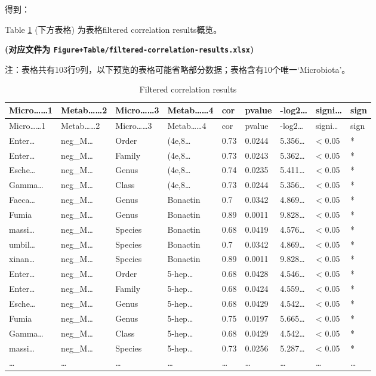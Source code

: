\documentclass[
]{article}
\begin{document}
得到：

Table \ref{tab:filtered-correlation-results} (下方表格) 为表格filtered correlation results概览。

\textbf{(对应文件为 \texttt{Figure+Table/filtered-correlation-results.xlsx})}

\begin{center}\begin{tcolorbox}[colback=gray!10, colframe=gray!50, width=0.9\linewidth, arc=1mm, boxrule=0.5pt]注：表格共有103行9列，以下预览的表格可能省略部分数据；表格含有10个唯一`Microbiota'。
\end{tcolorbox}
\end{center}

\begin{longtable}[]{@{}lllllllll@{}}
\caption{\label{tab:filtered-correlation-results}Filtered correlation results}\tabularnewline
\toprule
Micro\ldots\ldots1 & Metab\ldots\ldots2 & Micro\ldots\ldots3 & Metab\ldots\ldots4 & cor & pvalue & -log2\ldots{} & signi\ldots{} & sign\tabularnewline
\midrule
\endfirsthead
\toprule
Micro\ldots\ldots1 & Metab\ldots\ldots2 & Micro\ldots\ldots3 & Metab\ldots\ldots4 & cor & pvalue & -log2\ldots{} & signi\ldots{} & sign\tabularnewline
\midrule
\endhead
Enter\ldots{} & neg\_M\ldots{} & Order & (4e,8\ldots{} & 0.73 & 0.0244 & 5.356\ldots{} & \textless{} 0.05 & *\tabularnewline
Enter\ldots{} & neg\_M\ldots{} & Family & (4e,8\ldots{} & 0.73 & 0.0243 & 5.362\ldots{} & \textless{} 0.05 & *\tabularnewline
Esche\ldots{} & neg\_M\ldots{} & Genus & (4e,8\ldots{} & 0.74 & 0.0235 & 5.411\ldots{} & \textless{} 0.05 & *\tabularnewline
Gamma\ldots{} & neg\_M\ldots{} & Class & (4e,8\ldots{} & 0.73 & 0.0244 & 5.356\ldots{} & \textless{} 0.05 & *\tabularnewline
Faeca\ldots{} & neg\_M\ldots{} & Genus & Bonactin & 0.7 & 0.0342 & 4.869\ldots{} & \textless{} 0.05 & *\tabularnewline
Fumia & neg\_M\ldots{} & Genus & Bonactin & 0.89 & 0.0011 & 9.828\ldots{} & \textless{} 0.05 & *\tabularnewline
massi\ldots{} & neg\_M\ldots{} & Species & Bonactin & 0.68 & 0.0419 & 4.576\ldots{} & \textless{} 0.05 & *\tabularnewline
umbil\ldots{} & neg\_M\ldots{} & Species & Bonactin & 0.7 & 0.0342 & 4.869\ldots{} & \textless{} 0.05 & *\tabularnewline
xinan\ldots{} & neg\_M\ldots{} & Species & Bonactin & 0.89 & 0.0011 & 9.828\ldots{} & \textless{} 0.05 & *\tabularnewline
Enter\ldots{} & neg\_M\ldots{} & Order & 5-hep\ldots{} & 0.68 & 0.0428 & 4.546\ldots{} & \textless{} 0.05 & *\tabularnewline
Enter\ldots{} & neg\_M\ldots{} & Family & 5-hep\ldots{} & 0.68 & 0.0424 & 4.559\ldots{} & \textless{} 0.05 & *\tabularnewline
Esche\ldots{} & neg\_M\ldots{} & Genus & 5-hep\ldots{} & 0.68 & 0.0429 & 4.542\ldots{} & \textless{} 0.05 & *\tabularnewline
Fumia & neg\_M\ldots{} & Genus & 5-hep\ldots{} & 0.75 & 0.0197 & 5.665\ldots{} & \textless{} 0.05 & *\tabularnewline
Gamma\ldots{} & neg\_M\ldots{} & Class & 5-hep\ldots{} & 0.68 & 0.0429 & 4.542\ldots{} & \textless{} 0.05 & *\tabularnewline
massi\ldots{} & neg\_M\ldots{} & Species & 5-hep\ldots{} & 0.73 & 0.0256 & 5.287\ldots{} & \textless{} 0.05 & *\tabularnewline
\ldots{} & \ldots{} & \ldots{} & \ldots{} & \ldots{} & \ldots{} & \ldots{} & \ldots{} & \ldots{}\tabularnewline
\bottomrule
\end{longtable}
\end{document}
